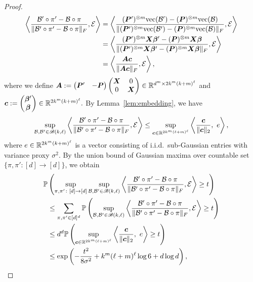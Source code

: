 \documentclass[11pt]{article}
\theoremstyle{definition}
\def\caliB{\mathscr{B}}
\begin{document}
\begin{proof}
\begin{align}
   \left\langle {\mathcal{B}'\circ \pi'-\mathcal{B}\circ \pi \over \lVert\mathcal{B}'\circ \pi'-\mathcal{B}\circ \pi\rVert_F}, \mathcal{E} \right \rangle &=  \left\langle {(\bm{P}')^{\otimes m}\text{vec}(\mathcal{B}')-(\bm{P})^{\otimes m}\text{vec}(\mathcal{B}) \over \lVert(\bm{P}')^{\otimes m}\text{vec}(\mathcal{B}')-(\bm{P})^{\otimes m}\text{vec}(\mathcal{B})\rVert_F}, \mathcal{E} \right \rangle\\
    &=\left\langle {(\bm{P}')^{\otimes m}\bm X\boldsymbol{\beta}'-(\bm{P})^{\otimes m}\bm X\boldsymbol{\beta}\over \lVert(\bm{P}')^{\otimes m}\bm X\boldsymbol{\beta}'-(\bm{P})^{\otimes m}\bm X\boldsymbol{\beta}\rVert_F}, \mathcal{E} \right \rangle\\&=
     \left\langle {\bm A\bm{c}\over \lVert\bm A\bm{c}\rVert_F}, \mathcal{E} \right \rangle,
\end{align}
where we define $\bm A := \begin{pmatrix}\bm{P}' &-\bm{P}\end{pmatrix}\begin{pmatrix}\bm X & 0\\ 0&\bm X\end{pmatrix}\in\mathbb{R}^{d^m\times 2k^m(k+m)^\ell}$ and $\bm{c}:=\begin{pmatrix} \boldsymbol{\beta}'\\\boldsymbol{\beta}\end{pmatrix}\in\mathbb{R}^{2k^m(k+m)^\ell}.$
By Lemma~\ref{lem:embedding}, we have 
\begin{align}\label{eq:embedding}
\sup_{\tB, \tB'\in \caliB(k,\ell)} \left\langle {\tB'\circ \pi'-\tB\circ \pi \over \FnormSize{}{\tB'\circ \pi'-\tB\circ \pi}}, \tE \right \rangle \leq \sup_{\mc\in \bbR^{2k^m(\ell+m)^\ell } }\left\langle {\mc\over \vnormSize{}{\mc}},\ e \right\rangle,
\end{align}
where  $e\in\mathbb{R}^{2k^m(k+m)^\ell}$ is a vector consisting of i.i.d.\ sub-Gaussian entries with variance proxy $\sigma^2$. 
By the union bound of Gaussian maxima over countable set $\{\pi,\pi'\colon [d]\to[d]\}$, we obtain
\begin{align}\label{eq:union}
    \mathbb{P}&\left(\sup_{\pi, \pi'\colon[d]\to[d]}\sup_{\tB, \tB'\in \caliB(k,\ell)} \left\langle {\tB'\circ \pi'-\tB\circ \pi \over \FnormSize{}{\tB'\circ \pi'-\tB\circ \pi}}, \tE \right \rangle\geq t\right)\\
    &\leq \sum_{\pi,\pi'\in[d]^d}\mathbb{P}\left(\sup_{\tB, \tB'\in \caliB(k,\ell)} \left\langle {\tB'\circ \pi'-\tB\circ \pi \over \FnormSize{}{\tB'\circ \pi'-\tB\circ \pi}}, \tE \right \rangle\geq t\right)\\
    &\leq d^d\mathbb{P}\left( \sup_{\mc\in \bbR^{2k^m(\ell+m)^\ell } }\left\langle {\mc\over \vnormSize{}{\mc}},\ e \right\rangle\geq t\right)\\&\leq \exp\left(-\frac{t^2}{8\sigma^2} +k^m(\ell+m)^\ell\log 6 + d\log d\right),

\end{align}
\end{proof}
\end{document}
